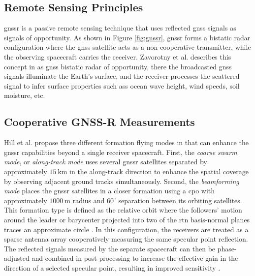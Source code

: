\subsection{Remote Sensing Principles}
\gls{gnssr} is a passive remote sensing technique that uses reflected \gls{gnss} signals as signals of opportunity. As shown in Figure \ref{fig:gnssr}, \gls{gnssr} forms a bistatic radar configuration where the \gls{gnss} satellite acts as a non-cooperative transmitter, while the observing spacecraft carries the receiver. Zavorotny et al. describes this concept in \cite{zavorotny2014tutorial} as \gls{gnss} bistatic radar of opportunity, there the broadcasted \gls{gnss} signals illuminate the Earth's surface, and the receiver processes the scattered signal to infer surface properties such ass ocean wave height, wind speeds, soil moisture, etc. 







\subsection{Cooperative GNSS-R Measurements}
\label{sec:gnssr_coop_measurements}

Hill et al. propose three different formation flying modes in \cite{hill2025hydroswarm} that can enhance the \gls{gnssr} capabilities beyond a single receiver spacecraft. First, the \textit{coarse swarm mode}, or \textit{along-track mode} uses several \gls{gnssr} satellites separated by approximately $15~\mathrm{km}$ in the along-track direction to enhance the spatial coverage by observing adjacent ground tracks simultaneously. Second, the \textit{beamforming mode} places the \gls{gnssr} satellites in a closer formation using a \gls{cpo} with approximately $1000~\mathrm{m}$ radius and $60^\circ$ separation between its orbiting satellites. This formation type is defined as the relative orbit where the followers' motion around the leader or barycenter projected into two of the \gls{rtn} basis-normal planes traces an approximate circle \cite{pco2022}. In this configuration, the receivers are treated as a sparse antenna array cooperatively measuring the same specular point reflection. The reflected signals measured by the separate spacecraft can then be phase-adjusted and combined in post-processing to increase the effective gain in the direction of a selected specular point, resulting in improved sensitivity \cite{hill2025hydroswarm}.

